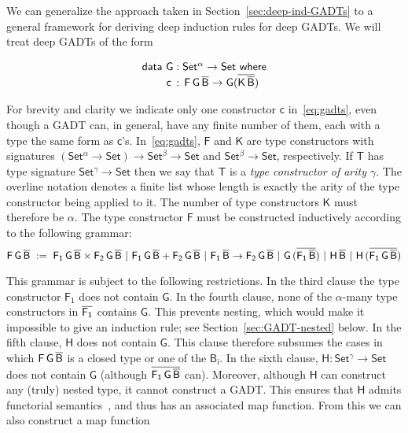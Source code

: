 \documentclass[9pt]{entcs}
\begin{document}
We can generalize the approach taken in
Section~\ref{sec:deep-ind-GADTs} to a general framework for deriving
deep induction rules for deep GADTs. We will treat deep GADTs of the
form 

\vspace*{-0.05in}

\begin{equation}\label{eq:gadts}
\begin{array}{l}
  \mathsf{data\ G : Set^\alpha
    \to Set\ where}\\
\mathsf{\;\;\;\;\;\;\;\;c\, :\, F\,G\,\overline{B} \to G (\overline{K\,\overline{B}})}
\end{array}
\end{equation}

\vspace*{-0.05in}

\noindent
For brevity and clarity we indicate only one constructor $\mathsf{c}$
in~\eqref{eq:gadts}, even though a GADT can, in general, have any
finite number of them, each with a type the same form as
$\mathsf{c}$'s. In~\eqref{eq:gadts}, $\mathsf{F}$ and $\mathsf{K}$ are
type constructors with signatures $\mathsf{(Set^{\alpha} \to Set) \to
  Set^{\beta} \to Set}$ and $\mathsf{Set^{\beta} \to Set}$,
respectively. If $\mathsf{T}$ has type signature $\mathsf{Set^{\gamma}
  \to Set}$ then we say that $\mathsf{T}$ is a {\em type constructor
  of arity $\mathsf{\gamma}$}.  The overline notation denotes a finite
list whose length is exactly the arity of the type constructor being
applied to it. The number of type constructors $\mathsf{K}$ must
therefore be $\alpha$. The type constructor $\mathsf{F}$ must be
constructed inductively according to the following grammar:
\[\mathsf{F\,G\,\overline{B}\; :=\;
F_1\,G\,\overline{B} \times F_2\,G\,\overline{B} \ \vert\ F_1\,G\,\overline{B} +
F_2\,G\,\overline{B} \ \vert\ F_1\,\overline{B} \to F_2\,G\,\overline{B}
\ \vert\ G\,(\overline{F_1\,\overline{B}}) \ \vert\ H\,\overline{B} \ \vert\ H\,
(\overline{F_1\,G\,\overline{B}}) }\]


\pagebreak

\noindent
This grammar is subject to the following restrictions. In the third
clause the type constructor $\mathsf{F_1}$ does not contain
$\mathsf{G}$. In the fourth clause, none of the $\mathsf{\alpha}$-many
type constructors in $\mathsf{\overline{F_1}}$ contains $\mathsf{G}$.  This
prevents nesting, which would make it impossible to give an induction
rule; see Section~\ref{sec:GADT-nested} below. In the fifth clause,
$\mathsf{H}$ does not contain $\mathsf{G}$. This clause therefore
subsumes the cases in which $\mathsf{F\,G\,\overline{B}}$ is a closed type
or one of the $\mathsf{B_i}$. In the sixth clause, $\mathsf{H :
  Set^\gamma \to Set}$ does not contain $\mathsf{G}$ (although
$\overline{\mathsf{F_1\,G\,\overline{B}}}$ can). Moreover, although $\mathsf{H}$
can construct any (truly) nested type, it cannot construct a
GADT. This ensures that $\mathsf{H}$ admits functorial
semantics~\cite{jp20}, and thus has an associated map function. From
this we can also construct a map function 
\end{document}
